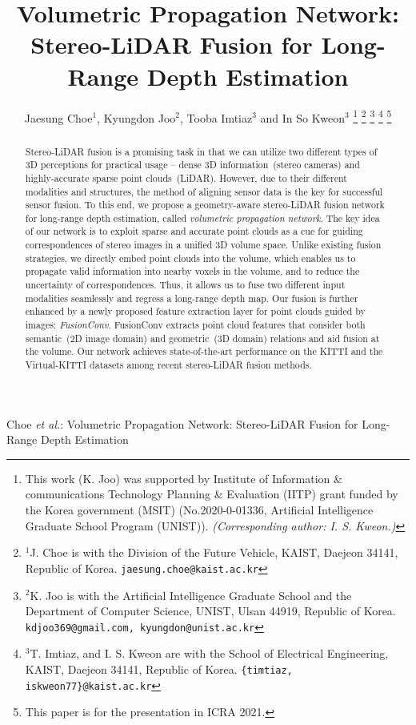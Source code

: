 \documentclass[letterpaper, 10 pt, conference]{ieeeconf}
\begin{document}
\title{\LARGE \bf
Volumetric Propagation Network: \\ Stereo-LiDAR Fusion for Long-Range Depth Estimation
}

\author{Jaesung Choe$^{1}$, Kyungdon Joo$^{2}$, Tooba Imtiaz$^{3}$ and In So Kweon$^{3}$
\thanks{This work (K. Joo) was supported by Institute of Information \& communications Technology Planning \& Evaluation (IITP) grant funded by the Korea government (MSIT) (No.2020-0-01336, Artificial Intelligence Graduate School Program (UNIST)). \textit{(Corresponding author: I. S. Kweon.)}
}
\thanks{$^{1}$J. Choe is with the Division of the Future Vehicle, KAIST, Daejeon 34141, Republic of Korea.
{\tt jaesung.choe@kaist.ac.kr}}
\thanks{$^{2}$K. Joo is with the Artificial Intelligence Graduate School and the Department of Computer Science, UNIST, Ulsan 44919, Republic of Korea.
{\tt kdjoo369@gmail.com, kyungdon@unist.ac.kr}}
\thanks{$^{3}$T. Imtiaz, and I. S. Kweon are with the School of Electrical Engineering, KAIST, Daejeon 34141, Republic of Korea.
{\tt \{timtiaz, iskweon77\}@kaist.ac.kr}}
\thanks{This paper is for the presentation in ICRA 2021.}
}




{Choe \MakeLowercase{\textit{et al.}}: Volumetric Propagation Network: Stereo-LiDAR Fusion for Long-Range Depth Estimation}

\maketitle





\begin{abstract}
Stereo-LiDAR fusion is a promising task in that we can utilize two different types of 3D perceptions for practical usage -- dense 3D information~(stereo cameras) and highly-accurate sparse point clouds~(LiDAR). However, due to their different modalities and structures, the method of aligning sensor data is the key for successful sensor fusion.
To this end, we propose a geometry-aware stereo-LiDAR fusion network for long-range depth estimation, called \emph{volumetric propagation network}. The key idea of our network is to exploit sparse and accurate point clouds as a cue for guiding correspondences of stereo images in a unified 3D volume space. Unlike existing fusion strategies, we directly embed point clouds into the volume, which enables us to propagate valid information into nearby voxels in the volume, and to reduce the uncertainty of correspondences. Thus, it allows us to fuse two different input modalities seamlessly and regress a long-range depth map. Our fusion is further enhanced by a newly proposed feature extraction layer for point clouds guided by images: \emph{FusionConv}. FusionConv extracts point cloud features that consider both semantic~(2D image domain) and geometric~(3D domain) relations and aid fusion at the volume. Our network achieves state-of-the-art performance on the KITTI and the Virtual-KITTI datasets among recent stereo-LiDAR fusion methods. 
\end{abstract}
\end{document}
